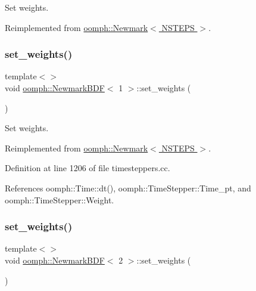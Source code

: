 Set weights. 



Reimplemented from \hyperlink{classoomph_1_1Newmark_ad175de47f064359fa319a11088b759aa}{oomph\+::\+Newmark$<$ N\+S\+T\+E\+P\+S $>$}.

\mbox{\label{classoomph_1_1NewmarkBDF_a4ac70586d355c8f45ec8dd4f94c3316a}} 
\subsubsection{\texorpdfstring{set\+\_\+weights()}{set\_weights()}\hspace{0.1cm}{\footnotesize\ttfamily [2/4]}}
{\footnotesize\ttfamily template$<$$>$ \\
void \hyperlink{classoomph_1_1NewmarkBDF}{oomph\+::\+Newmark\+B\+DF}$<$ 1 $>$\+::set\+\_\+weights (\begin{DoxyParamCaption}{ }\end{DoxyParamCaption})\hspace{0.3cm}{\ttfamily [virtual]}}



Set weights. 



Reimplemented from \hyperlink{classoomph_1_1Newmark_ad175de47f064359fa319a11088b759aa}{oomph\+::\+Newmark$<$ N\+S\+T\+E\+P\+S $>$}.



Definition at line 1206 of file timesteppers.\+cc.



References oomph\+::\+Time\+::dt(), oomph\+::\+Time\+Stepper\+::\+Time\+\_\+pt, and oomph\+::\+Time\+Stepper\+::\+Weight.

\mbox{\label{classoomph_1_1NewmarkBDF_af474fb6329584b3055d757a743919fda}} 
\subsubsection{\texorpdfstring{set\+\_\+weights()}{set\_weights()}\hspace{0.1cm}{\footnotesize\ttfamily [3/4]}}
{\footnotesize\ttfamily template$<$$>$ \\
void \hyperlink{classoomph_1_1NewmarkBDF}{oomph\+::\+Newmark\+B\+DF}$<$ 2 $>$\+::set\+\_\+weights (\begin{DoxyParamCaption}{ }\end{DoxyParamCaption})\hspace{0.3cm}{\ttfamily [virtual]}}



